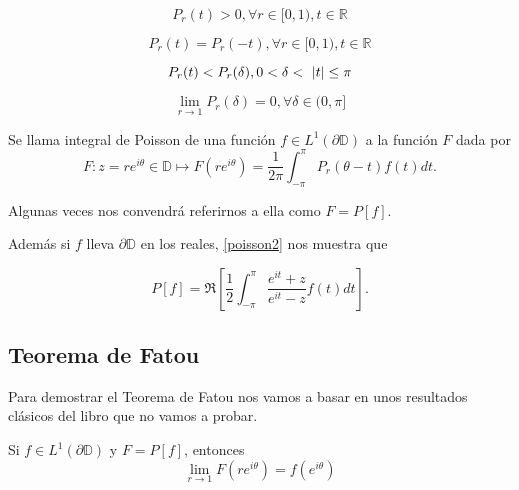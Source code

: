 \begin{equation}
    P_r(t) > 0, \forall r \in [0,1), t \in \mathbb{R}
\end{equation}

\begin{equation}
    P_r(t) = P_r(-t), \forall r \in [0,1), t \in \mathbb{R}
\end{equation}

\begin{equation}
    P_r(t) < P_r(\delta), 0 < \delta < \abs{t} \leq \pi
\end{equation}

\begin{equation}
    \lim_{r \rightarrow 1} P_r(\delta) = 0, \forall \delta \in (0,\pi]
\end{equation}

\bigskip \par

\begin{definition}
    Se llama integral de Poisson de una función $f \in L^1(\partial \mathbb{D})$ a la función $F$ dada por
    \begin{equation*}
        F: z=re^{i \theta} \in \mathbb{D} \mapsto F(re^{i \theta}) = \dfrac{1}{2 \pi} \int_{- \pi}^{\pi} P_r (\theta - t) f(t) dt.
    \end{equation*}

    Algunas veces nos convendrá referirnos a ella como $F=P[f]$.
\end{definition}

\bigskip

Además si $f$ lleva $\partial \mathbb{D}$ en los reales, \ref{poisson2} nos muestra que

\begin{equation*}
     P[f] = \Re \left[ \dfrac{1}{2} \int_{-\pi}^{\pi} \dfrac{e^{it} + z}{e^{it} - z} f(t) dt \right].
\end{equation*}

\subsection{Teorema de Fatou}

Para demostrar el Teorema de Fatou nos vamos a basar en unos resultados clásicos del libro \citet[chap. 11]{rudin} que no vamos a probar.

\begin{theorem}
\label{fatouaux1}
    Si $f \in L^1(\partial \mathbb{D})$ y $F = P[f]$, entonces
    \begin{equation*}
        \lim_{r \rightarrow 1} F(re^{i \theta}) = f(e^{i \theta})
    \end{equation*}
\end{theorem}

